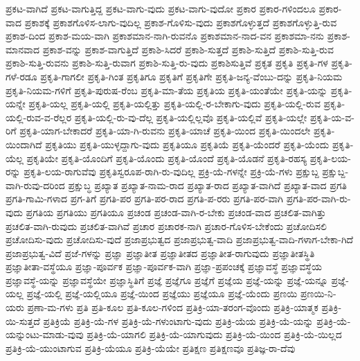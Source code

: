 {ಪ್ರಕಟ-ವಾಗಿದೆ
ಪ್ರಕಟ-ವಾಗುತ್ತಿದ್ದ
ಪ್ರಕಟ-ವಾಗು-ವುದು
ಪ್ರಕಟ-ವಾಗು-ವುದೋ
ಪ್ರಕಾರ
ಪ್ರಕಾರ-ಗಳಿಂದಲೂ
ಪ್ರಕಾರ-ವಾದ
ಪ್ರಕಾಶಕ್ಕೆ
ಪ್ರಕಾಶಗೊಳಿಸ-ಲಾಗು-ವುದಿಲ್ಲ
ಪ್ರಕಾಶ-ಗೊಳಿಸು-ವುದು
ಪ್ರಕಾಶಗೊಳ್ಳುತ್ತದೆ
ಪ್ರಕಾಶಗೊಳ್ಳುತ್ತಿ-ರುವ
ಪ್ರಕಾಶ-ದಿಂದ
ಪ್ರಕಾಶ-ಮಯ-ವಾಗಿ
ಪ್ರಕಾಶಮಾನ-ನಾಗಿ-ರುವನೊ
ಪ್ರಕಾಶಮಾನ-ನಾದ-ವನ
ಪ್ರಕಾಶಮಾ-ನನು
ಪ್ರಕಾಶ-ಮಾನವಾದ
ಪ್ರಕಾಶ-ವನ್ನು
ಪ್ರಕಾಶ-ವಾಗುತ್ತಿದೆ
ಪ್ರಕಾಶಿ-ಸಿದರೆ
ಪ್ರಕಾಶಿ-ಸುತ್ತದೆ
ಪ್ರಕಾಶಿ-ಸುತ್ತಿದೆ
ಪ್ರಕಾಶಿ-ಸುತ್ತಿ-ರುವ
ಪ್ರಕಾಶಿ-ಸುತ್ತಿ-ರುವನು
ಪ್ರಕಾಶಿ-ಸುತ್ತಿ-ರುವಾಗ
ಪ್ರಕಾಶಿ-ಸುತ್ತಿ-ರು-ವುದು
ಪ್ರಕಾಶಿಸುತ್ತಿವೆ
ಪ್ರಕೃತ
ಪ್ರಕೃತಿ
ಪ್ರಕೃತಿ-ಗಳ
ಪ್ರಕೃತಿ-ಗಳೆ-ರಡೂ
ಪ್ರಕೃತಿ-ಗಾಗಲೀ
ಪ್ರಕೃತಿ-ಗಿಂತ
ಪ್ರಕೃತಿಗೂ
ಪ್ರಕೃತಿಗೆ
ಪ್ರಕೃತಿಗೇ
ಪ್ರಕೃತಿ-ಜನ್ಯ-ವೆಂಬು-ದನ್ನು
ಪ್ರಕೃತಿ-ನಿಯಮ
ಪ್ರಕೃತಿ-ನಿಯಮ-ಗಳಿಗೆ
ಪ್ರಕೃತಿ-ಪುರುಷ-ರೆಂಬ
ಪ್ರಕೃತಿ-ಮಾ-ತೆಯ
ಪ್ರಕೃತಿಯ
ಪ್ರಕೃತಿ-ಯಂತೆಯೇ
ಪ್ರಕೃತಿ-ಯನ್ನು
ಪ್ರಕೃತಿ-ಯನ್ನೇ
ಪ್ರಕೃತಿ-ಯಲ್ಲ
ಪ್ರಕೃತಿ-ಯಲ್ಲಿ
ಪ್ರಕೃತಿ-ಯಲ್ಲಿತ್ತು
ಪ್ರಕೃತಿ-ಯಲ್ಲಿ-ರ-ಬೇಕಾಗು-ವುದು
ಪ್ರಕೃತಿ-ಯಲ್ಲಿ-ರುವ
ಪ್ರಕೃತಿ-ಯಲ್ಲಿ-ರುವ-ವ-ರೆಲ್ಲರ
ಪ್ರಕೃತಿ-ಯಲ್ಲಿ-ರು-ವು-ದೆಲ್ಲ
ಪ್ರಕೃತಿ-ಯಲ್ಲಿಲ್ಲವೊ
ಪ್ರಕೃತಿ-ಯಲ್ಲಿವೆ
ಪ್ರಕೃತಿ-ಯಲ್ಲೇ
ಪ್ರಕೃತಿ-ಯ-ವ-ರಿಗೆ
ಪ್ರಕೃತಿ-ಯಾಗ-ಬೇಕಾದರೆ
ಪ್ರಕೃತಿ-ಯಾ-ಗಿ-ರುವನು
ಪ್ರಕೃತಿ-ಯಾಚೆ
ಪ್ರಕೃತಿ-ಯಿಂದ
ಪ್ರಕೃತಿ-ಯಿಂದಲೇ
ಪ್ರಕೃತಿ-ಯಿಂದಾಗಿದೆ
ಪ್ರಕೃತಿಯು
ಪ್ರಕೃತಿ-ಯುಳ್ಳದ್ದಾಗು-ವುದು
ಪ್ರಕೃತಿಯೂ
ಪ್ರಕೃತಿಯೆ
ಪ್ರಕೃತಿ-ಯೆಂದರೆ
ಪ್ರಕೃತಿ-ಯೆಂದು
ಪ್ರಕೃತಿ-ಯೆಲ್ಲ
ಪ್ರಕೃತಿಯೇ
ಪ್ರಕೃತಿ-ಯೊಂದಿಗೆ
ಪ್ರಕೃತಿ-ಯೊಂದು
ಪ್ರಕೃತಿ-ಯೊಂದೆ
ಪ್ರಕೃತಿ-ಯೊಡನೆ
ಪ್ರಕೃತಿ-ರಹಸ್ಯ
ಪ್ರಕೃತಿ-ಲಯ-ರನ್ನು
ಪ್ರಕೃತಿ-ಲಯ-ರಾಗುವೆವು
ಪ್ರಕೃತಿಸ್ವರೂಪ-ರಾಗಿ-ರು-ವುದಿಲ್ಲ
ಪ್ರಕ್ರಿ-ಯೆ-ಗಳನ್ನೇ
ಪ್ರಕ್ರಿ-ಯೆ-ಗಳು
ಪ್ರಕ್ಷುಬ್ದ
ಪ್ರಕ್ಷುಬ್ದ-ವಾಗಿ-ರುವು-ದರಿಂದ
ಪ್ರಕ್ಷುಬ್ಧ
ಪ್ರಖ್ಯಾತ
ಪ್ರಖ್ಯಾತ-ನಾಮ-ರಾದ
ಪ್ರಖ್ಯಾತ-ರಾದ
ಪ್ರಖ್ಯಾತ-ವಾಗಿದೆ
ಪ್ರಖ್ಯಾತ-ವಾದ
ಪ್ರಗತಿ
ಪ್ರಗತಿ-ಗಾಮಿ-ಗಳಾದ
ಪ್ರಗ-ತಿಗೆ
ಪ್ರಗತಿ-ಪರ
ಪ್ರಗತಿ-ಪರ-ರಾದ
ಪ್ರಗತಿ-ಪ-ರರು
ಪ್ರಗತಿ-ಪರ-ವಾಗಿ
ಪ್ರಗತಿ-ಪರ-ವಾಗಿ-ರು-ವುದು
ಪ್ರಗತಿಯ
ಪ್ರಗತಿಯು
ಪ್ರಗತಿಯೂ
ಪ್ರಚಂಡ
ಪ್ರಚಂಡ-ವಾಗಿ-ರ-ಬೇಕು
ಪ್ರಚಂಡ-ವಾದ
ಪ್ರಚಲಿತ-ವಾಗಿತ್ತು
ಪ್ರಚಲಿತ-ವಾಗಿ-ರುವುದು
ಪ್ರಚಲಿತ-ವಾಗಿವೆ
ಪ್ರಚಾರ
ಪ್ರಚಾರಕ-ನಾಗಿ
ಪ್ರಚಾರ-ಗೊಳಿಸ-ಬೇಕೆಂದು
ಪ್ರಚೋದಿಸಲಿ
ಪ್ರಚೋದಿಸು-ವುದು
ಪ್ರಚೋದಿಸು-ವುದೆ
ಪ್ರಜಾಪ್ರಭುತ್ವದ
ಪ್ರಜಾಪ್ರಭುತ್ವ-ವಾದಿ
ಪ್ರಜಾಪ್ರಭುತ್ವ-ವಾದಿ-ಗಳಾಗ-ಬೇಕಾ-ಗಿದೆ
ಪ್ರಜಾಪ್ರಭುತ್ವ-ವಿದೆ
ಪ್ರಜೆ-ಗಳನ್ನು
ಪ್ರಜ್ಞಾ
ಪ್ರಜ್ಞಾತೀತ
ಪ್ರಜ್ಞಾತೀತದ
ಪ್ರಜ್ಞಾತೀತ-ರಾಗುವುದು
ಪ್ರಜ್ಞಾತೀತಸ್ಥಿತಿ
ಪ್ರಜ್ಞಾತೀತಾ-ವಸ್ಥೆಯೂ
ಪ್ರಜ್ಞಾ-ಪೂರ್ವಕ
ಪ್ರಜ್ಞಾ-ಪೂರ್ವಕ-ವಾಗಿ
ಪ್ರಜ್ಞಾ-ಪ್ರಪಂಚಕ್ಕೆ
ಪ್ರಜ್ಞಾವಸ್ಥೆ
ಪ್ರಜ್ಞಾವಸ್ಥೆಯ
ಪ್ರಜ್ಞಾವಸ್ಥೆ-ಯನ್ನು
ಪ್ರಜ್ಞಾವಸ್ಥೆಯೇ
ಪ್ರಜ್ಞಾಸ್ಥಿತಿಗೆ
ಪ್ರಜ್ಞೆ
ಪ್ರಜ್ಞೆಗೂ
ಪ್ರಜ್ಞೆಗೆ
ಪ್ರಜ್ಞೆಯ
ಪ್ರಜ್ಞೆ-ಯನ್ನು
ಪ್ರಜ್ಞೆ-ಯನ್ನೂ
ಪ್ರಜ್ಞೆ-ಯಲ್ಲ
ಪ್ರಜ್ಞೆ-ಯಲ್ಲಿ
ಪ್ರಜ್ಞೆ-ಯಲ್ಲಿಯೂ
ಪ್ರಜ್ಞೆ-ಯಿಂದ
ಪ್ರಜ್ಞೆಯು
ಪ್ರಜ್ಞೆಯೂ
ಪ್ರಜ್ಞೆ-ಯೆಂದು
ಪ್ರಣಯಿ
ಪ್ರಣಯಿ-ನಿ-ಯರು
ಪ್ರಣಾ-ಮ-ಗಳು
ಪ್ರತಿ
ಪ್ರತಿ-ಕೂಲ
ಪ್ರತಿ-ಕೂಲ-ಗಳಿಂದ
ಪ್ರತಿಕ್ರಿ-ಯಾ-ತರಂಗ-ವೊಂದು
ಪ್ರತಿಕ್ರಿ-ಯಾತ್ಮಕ
ಪ್ರತಿಕ್ರಿ-ಯಿ-ಸುತ್ತದೆ
ಪ್ರತಿಕ್ರಿಯೆ
ಪ್ರತಿಕ್ರಿ-ಯೆ-ಗಳ
ಪ್ರತಿಕ್ರಿ-ಯೆ-ಗಳುಂಟಾಗು-ವುದು
ಪ್ರತಿಕ್ರಿ-ಯೆಯ
ಪ್ರತಿಕ್ರಿ-ಯೆ-ಯನ್ನು
ಪ್ರತಿಕ್ರಿ-ಯೆ-ಯನ್ನುಂಟು-ಮಾಡು-ವುವು
ಪ್ರತಿಕ್ರಿ-ಯೆ-ಯಾಗಲಿ
ಪ್ರತಿಕ್ರಿ-ಯೆ-ಯಾಗುವುದು
ಪ್ರತಿಕ್ರಿ-ಯೆ-ಯಿಂದ
ಪ್ರತಿಕ್ರಿ-ಯೆ-ಯಿಲ್ಲದ
ಪ್ರತಿಕ್ರಿ-ಯೆ-ಯುಂಟಾಗುವ
ಪ್ರತಿಕ್ರಿ-ಯೆಯೂ
ಪ್ರತಿಕ್ರಿ-ಯೆಯೇ
ಪ್ರತಿಕ್ಷಣ
ಪ್ರತಿಕ್ಷಣವೂ
ಪ್ರತಿಜ್ಞ-ರಾ-ದೆವು
}
